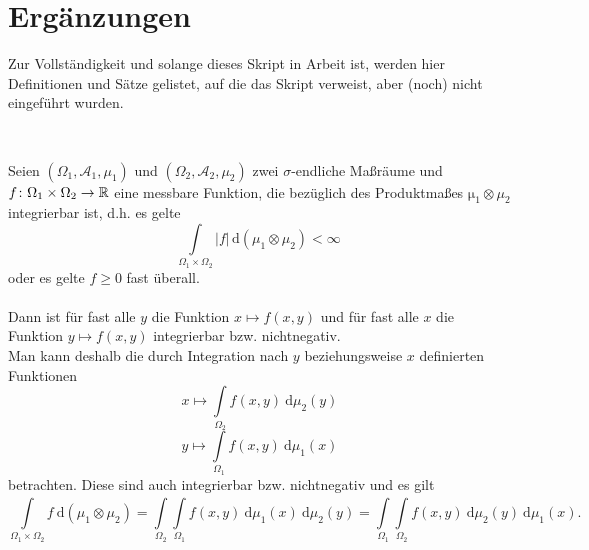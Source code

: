 

\section*{Ergänzungen} 


Zur Vollständigkeit und solange dieses Skript in Arbeit ist, werden hier Definitionen und Sätze gelistet, auf die das Skript verweist, aber (noch) nicht eingeführt wurden.

~

\begin{satz*}[Fubini]  \label{satz:x-SatzvonFubini}
	Seien $(\Omega_1, \mathcal{A}_1, \mu_1)$ und $(\Omega_2, \mathcal{A}_2, \mu_2)$ zwei $\sigma$-endliche Maßräume und $f \colon \Omega_1 \times \Omega_2 \rightarrow \mathbb{R}$ eine messbare Funktion, die bezüglich des Produktmaßes $\mathrm \mu_1 \otimes \mu_2$ integrierbar ist, d.h. es gelte
		\[ \int\limits_{\Omega_1 \times \Omega_2} |f| \, \mathrm d(\mu_1 \otimes \mu_2) < \infty \ \]
	oder es gelte $f \geq 0$ fast überall. \\ \\
	Dann ist für fast alle $y$ die Funktion $ x \mapsto f(x,y)$ und für fast alle $x$ die Funktion $y \mapsto f(x,y)$ integrierbar bzw. nichtnegativ. \\
	Man kann deshalb die durch Integration nach $y$ beziehungsweise $x$ definierten Funktionen
		\[  x \mapsto  \int\limits_{\Omega_2} f(x,y) ~ \mathrm d\mu_2(y)  \]
		\[ y \mapsto  \int\limits_{\Omega_1} f(x,y) ~ \mathrm d\mu_1(x) \]
	betrachten. Diese sind auch integrierbar bzw. nichtnegativ und es gilt
		\[ \int\limits_{\Omega_1 \times \Omega_2} f ~ \mathrm d(\mu_1 \otimes \mu_2) = \int\limits_{\Omega_2}^{}\int\limits_{\Omega_1}^{}f(x,y)~ \mathrm d\mu_1(x)~ \mathrm d\mu_2(y) = \int\limits_{\Omega_1}^{}\int\limits_{\Omega_2}^{}f(x,y)~\mathrm d\mu_2(y)~ \mathrm d\mu_1(x). \]
\end{satz*}

~

